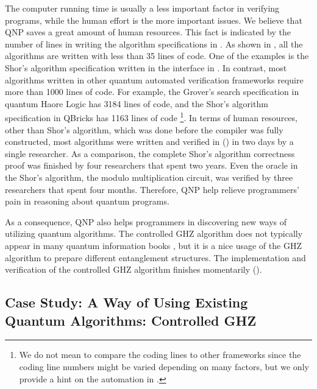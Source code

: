The computer running time is usually a less important factor in verifying programs, while the human effort is the more important issues. We believe that QNP saves a great amount of human resources. This fact is indicated by the number of lines in writing the algorithm specifications in \qafny. As shown in , all the algorithms are written with less than 35 lines of code. One of the examples is the Shor's algorithm specification written in the \qafny interface in .
In contrast, most algorithms written in other quantum automated verification frameworks require more than 1000 lines of code.
For example, the Grover's search specification in quantum Haore Logic \cite{qhoreusage} has 3184 lines of code, and the Shor's algorithm specification in QBricks \cite{qbricks} has 1163 lines of code \footnote{We do not mean to compare the coding lines to other frameworks since the coding line numbers might be varied depending on many factors, but we only provide a hint on the automation in \qafny.}.
In terms of human resources, other than Shor's algorithm, which was done before the \qafny compiler was fully constructed, most algorithms were written and verified in \qafny () in two days by a single researcher. 
As a comparison, the complete Shor's algorithm correctness proof \cite{shorsprove} was finished by four researchers that spent two years. Even the oracle in the Shor's algorithm, the modulo multiplication circuit, was verified by three researchers that spent four months. Therefore, QNP help relieve programmers' pain in reasoning about quantum programs.

As a consequence, QNP also helps programmers in discovering new ways of utilizing quantum algorithms. The controlled GHZ algorithm does not typically appear in many quantum information books \cite{mike-and-ike}, but it is a nice usage of the GHZ algorithm to prepare different entanglement structures. The implementation and verification of the controlled GHZ algorithm finishes momentarily ().


\subsection{Case Study: A Way of Using Existing Quantum Algorithms: Controlled GHZ}

